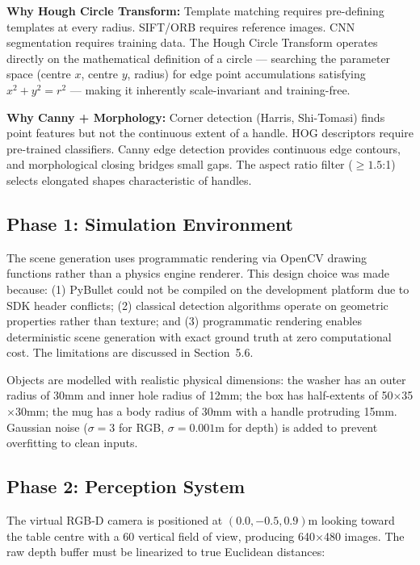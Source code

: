\documentclass[11pt,a4paper]{article}
\begin{document}
\textbf{Why Hough Circle Transform:} Template matching requires pre-defining templates at every radius. SIFT/ORB requires reference images. CNN segmentation requires training data. The Hough Circle Transform operates directly on the mathematical definition of a circle --- searching the parameter space (centre $x$, centre $y$, radius) for edge point accumulations satisfying $x^2 + y^2 = r^2$ --- making it inherently scale-invariant and training-free.

\textbf{Why Canny + Morphology:} Corner detection (Harris, Shi-Tomasi) finds point features but not the continuous extent of a handle. HOG descriptors require pre-trained classifiers. Canny edge detection provides continuous edge contours, and morphological closing bridges small gaps. The aspect ratio filter ($\geq 1.5$:1) selects elongated shapes characteristic of handles.

\subsection{Phase 1: Simulation Environment}

The scene generation uses programmatic rendering via OpenCV drawing functions rather than a physics engine renderer. This design choice was made because: (1) PyBullet could not be compiled on the development platform due to SDK header conflicts; (2) classical detection algorithms operate on geometric properties rather than texture; and (3) programmatic rendering enables deterministic scene generation with exact ground truth at zero computational cost. The limitations are discussed in Section~5.6.

Objects are modelled with realistic physical dimensions: the washer has an outer radius of 30mm and inner hole radius of 12mm; the box has half-extents of 50$\times$35$\times$30mm; the mug has a body radius of 30mm with a handle protruding 15mm. Gaussian noise ($\sigma\!=\!3$ for RGB, $\sigma\!=\!0.001$m for depth) is added to prevent overfitting to clean inputs.

\subsection{Phase 2: Perception System}

The virtual RGB-D camera is positioned at $(0.0, -0.5, 0.9)$m looking toward the table centre with a 60\textdegree{} vertical field of view, producing 640$\times$480 images. The raw depth buffer must be linearized to true Euclidean distances:
\end{document}
